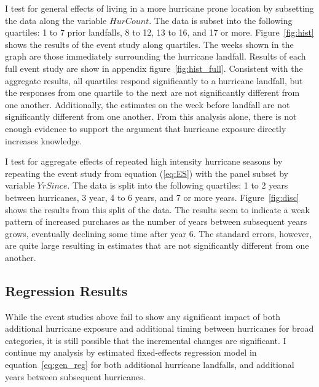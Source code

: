 \documentclass{article}
\begin{document}
I test for general effects of living in a more hurricane prone location by subsetting the data along the variable $HurCount$. The data is subset into the following quartiles: 1 to 7 prior landfalls, 8 to 12, 13 to 16, and 17 or more. Figure~\ref{fig:hist} shows the results of the event study along quartiles. The weeks shown in the graph are those immediately surrounding the hurricane landfall. Results of each full event study are show in appendix figure~\ref{fig:hist_full}. Consistent with the aggregate results, all quartiles respond significantly to a hurricane landfall, but the responses from one quartile to the next are not significantly different from one another. Additionally, the estimates on the week before landfall are not significantly different from one another. From this analysis alone, there is not enough evidence to support the argument that hurricane exposure directly increases knowledge. 




I test for aggregate effects of repeated high intensity hurricane seasons by repeating the event study from equation (\ref{eq:ES}) with the panel subset by variable $YrSince$. The data is split into the following quartiles: 1 to 2 years between hurricanes, 3 year, 4 to 6 years, and 7 or more years. Figure~\ref{fig:disc} shows the results from this split of the data. The results seem to indicate a weak pattern of increased purchases as the number of years between subsequent years grows, eventually declining some time after year 6. The standard errors, however, are quite large resulting in estimates that are not significantly different from one another. 

\subsection{Regression Results}

While the event studies above fail to show any significant impact of both additional hurricane exposure and additional timing between hurricanes for broad categories, it is still possible that the incremental changes are significant. I continue my analysis by estimated fixed-effects regression model in equation~\ref{eq:gen_reg} for both additional hurricane landfalls, and additional years between subsequent hurricanes.
\end{document}
